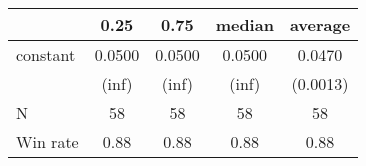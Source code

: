 \begin{tabular}{lcccc}
\hline
         &  0.25  &  0.75  & median & average   \\
\midrule
\midrule
constant & 0.0500 & 0.0500 & 0.0500 & 0.0470    \\
         & (inf)  & (inf)  & (inf)  & (0.0013)  \\
N        & 58     & 58     & 58     & 58        \\
Win rate & 0.88   & 0.88   & 0.88   & 0.88      \\
\hline
\end{tabular}